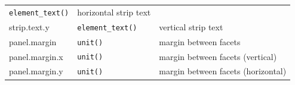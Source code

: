 \begin{longtable}[c]{@{}lll@{}}
\begin{minipage}[t]{0.24\columnwidth}\raggedright\strut
\texttt{element\_text()}
\strut\end{minipage} &
\begin{minipage}[t]{0.47\columnwidth}\raggedright\strut
horizontal strip text
\strut\end{minipage}\tabularnewline
\begin{minipage}[t]{0.27\columnwidth}\raggedright\strut
strip.text.y
\strut\end{minipage} &
\begin{minipage}[t]{0.24\columnwidth}\raggedright\strut
\texttt{element\_text()}
\strut\end{minipage} &
\begin{minipage}[t]{0.47\columnwidth}\raggedright\strut
vertical strip text
\strut\end{minipage}\tabularnewline
\begin{minipage}[t]{0.27\columnwidth}\raggedright\strut
panel.margin
\strut\end{minipage} &
\begin{minipage}[t]{0.24\columnwidth}\raggedright\strut
\texttt{unit()}
\strut\end{minipage} &
\begin{minipage}[t]{0.47\columnwidth}\raggedright\strut
margin between facets
\strut\end{minipage}\tabularnewline
\begin{minipage}[t]{0.27\columnwidth}\raggedright\strut
panel.margin.x
\strut\end{minipage} &
\begin{minipage}[t]{0.24\columnwidth}\raggedright\strut
\texttt{unit()}
\strut\end{minipage} &
\begin{minipage}[t]{0.47\columnwidth}\raggedright\strut
margin between facets (vertical)
\strut\end{minipage}\tabularnewline
\begin{minipage}[t]{0.27\columnwidth}\raggedright\strut
panel.margin.y
\strut\end{minipage} &
\begin{minipage}[t]{0.24\columnwidth}\raggedright\strut
\texttt{unit()}
\strut\end{minipage} &
\begin{minipage}[t]{0.47\columnwidth}\raggedright\strut
margin between facets (horizontal)
\strut\end{minipage}\tabularnewline
\bottomrule
\end{longtable}

